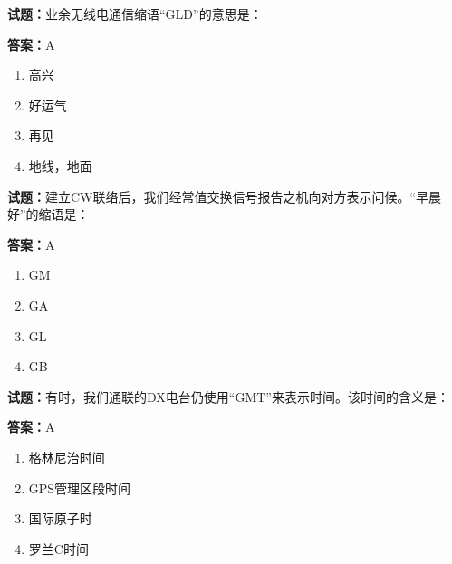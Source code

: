 \documentclass{ctexbook}
\begin{document}




\vspace{1em}

\textbf{试题：}业余无线电通信缩语“GLD”的意思是： 

\textbf{答案：}A 

\begin{enumerate}[leftmargin=3em]
  \item 高兴 

  \item 好运气 

  \item 再见 

  \item 地线，地面 

\end{enumerate}





\vspace{1em}

\textbf{试题：}建立CW联络后，我们经常值交换信号报告之机向对方表示问候。“早晨好”的缩语是： 

\textbf{答案：}A 

\begin{enumerate}[leftmargin=3em]
  \item GM 

  \item GA 

  \item GL 

  \item GB 

\end{enumerate}






\vspace{1em}

\textbf{试题：}有时，我们通联的DX电台仍使用“GMT”来表示时间。该时间的含义是： 

\textbf{答案：}A 

\begin{enumerate}[leftmargin=3em]
  \item 格林尼治时间 

  \item GPS管理区段时间 

  \item 国际原子时 

  \item 罗兰C时间 

\end{enumerate}
\end{document}
